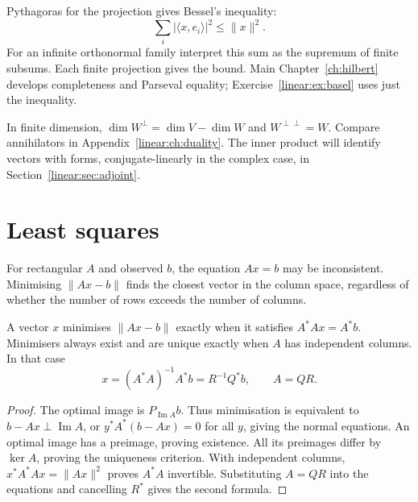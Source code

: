 Pythagoras for the projection gives Bessel's inequality:
\begin{equation}\label{linear:eq:bessel}
\sum_i|\langle x,e_i\rangle|^2\le\|x\|^2.
\end{equation}
For an infinite orthonormal family interpret this sum as the supremum of finite subsums. Each finite projection gives the bound. Main Chapter~\ref{ch:hilbert} develops completeness and Parseval equality; Exercise~\ref{linear:ex:basel} uses just the inequality.

In finite dimension, $\dim W^\perp=\dim V-\dim W$ and $W^{\perp\perp}=W$. Compare annihilators in Appendix~\ref{linear:ch:duality}. The inner product will identify vectors with forms, conjugate-linearly in the complex case, in Section~\ref{linear:sec:adjoint}.

\section{Least squares}

For rectangular $A$ and observed $b$, the equation $Ax=b$ may be inconsistent. Minimising $\|Ax-b\|$ finds the closest vector in the column space, regardless of whether the number of rows exceeds the number of columns.

\begin{theorem}\label{linear:thm:lsq}
A vector $x$ minimises $\|Ax-b\|$ exactly when it satisfies $A^*Ax=A^*b$. Minimisers always exist and are unique exactly when $A$ has independent columns. In that case
\[x=(A^*A)^{-1}A^*b=R^{-1}Q^*b,\qquad A=QR.\]
\end{theorem}
\begin{proof}
The optimal image is $P_{\operatorname{Im}A}b$. Thus minimisation is equivalent to $b-Ax\perp\operatorname{Im}A$, or $y^*A^*(b-Ax)=0$ for all $y$, giving the normal equations. An optimal image has a preimage, proving existence. All its preimages differ by $\ker A$, proving the uniqueness criterion. With independent columns, $x^*A^*Ax=\|Ax\|^2$ proves $A^*A$ invertible. Substituting $A=QR$ into the equations and cancelling $R^*$ gives the second formula.
\end{proof}

